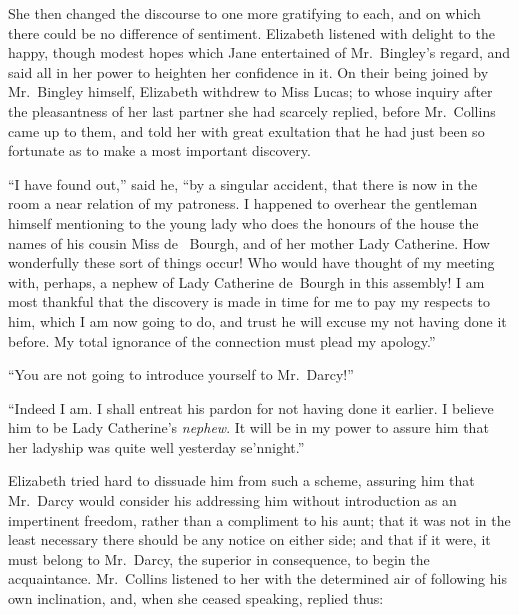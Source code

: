 She then changed the discourse to one more gratifying to each,
and on which there could be no difference of sentiment.
Elizabeth listened with delight to the happy, though modest
hopes which Jane entertained of Mr.\ Bingley's regard, and said
all in her power to heighten her confidence in it.  On their being
joined by Mr.\ Bingley himself, Elizabeth withdrew to Miss
Lucas; to whose inquiry after the pleasantness of her last partner
she had scarcely replied, before Mr.\ Collins came up to them,
and told her with great exultation that he had just been so
fortunate as to make a most important discovery.

``I have found out,'' said he, ``by a singular accident, that there
is now in the room a near relation of my patroness.  I happened
to overhear the gentleman himself mentioning to the young lady who
does the honours of the house the names of his cousin Miss de~%
Bourgh, and of her mother Lady Catherine.  How wonderfully these
sort of things occur!  Who would have thought of my meeting with,
perhaps, a nephew of Lady Catherine de~Bourgh in this assembly!
I am most thankful that the discovery is made in time for me to
pay my respects to him, which I am now going to do, and trust
he will excuse my not having done it before.  My total ignorance
of the connection must plead my apology.''

``You are not going to introduce yourself to Mr.\ Darcy!''

``Indeed I am.  I shall entreat his pardon for not having done it
earlier.  I believe him to be Lady Catherine's \emph{nephew}.  It will
be in my power to assure him that her ladyship was quite well
yesterday se'nnight.''

Elizabeth tried hard to dissuade him from such a scheme,
assuring him that Mr.\ Darcy would consider his addressing him
without introduction as an impertinent freedom, rather than a
compliment to his aunt; that it was not in the least necessary
there should be any notice on either side; and that if it were,
it must belong to Mr.\ Darcy, the superior in consequence, to
begin the acquaintance.  Mr.\ Collins listened to her with the
determined air of following his own inclination, and, when she
ceased speaking, replied thus:

